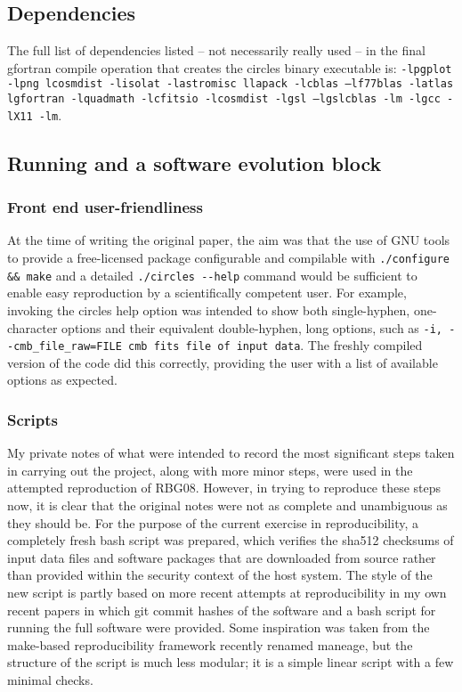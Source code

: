 \subsection{Dependencies}

The full list of dependencies listed -- not necessarily really used -- in
the final {\sc gfortran} compile operation that creates the {\sc circles}
binary executable is:
{\tt \mbox{\tt -lpgplot} -lpng lcosmdist -lisolat -lastromisc llapack -lcblas
--lf77blas -latlas lgfortran -lquadmath -lcfitsio -lcosmdist -lgsl
--lgslcblas -lm -lgcc -lX11 -lm}. \sloppy

\subsection{Running and a software evolution block} \label{s-running}

\subsubsection{Front end user-friendliness}

At the time of writing the original paper, the aim was that the use of GNU
tools to provide a free-licensed package configurable and compilable
with {\tt ./configure \&\& make} and a detailed {\tt ./circles
  -{}-help} command would be sufficient to enable easy reproduction by
a scientifically competent user. For example, invoking the {\sc
  circles} help option was intended to show both single-hyphen, one-character options
and their equivalent double-hyphen, long options, such as
\mbox{{\tt -i,  -{}-cmb\_file\_raw=FILE cmb fits file of input data}}.
The freshly compiled version of the code did this correctly, providing the
user with a list of available options as expected.
\sloppy

\subsubsection{Scripts}

\fussy
My private notes of what were intended to record the most significant steps
taken in carrying out the project, along with more minor steps, were
used in the attempted reproduction of RBG08.  However, in trying to
reproduce these steps now, it is clear that the original notes were
not as complete and unambiguous as they should be.  For the purpose of
the current exercise in reproducibility, a completely fresh {\sc bash}
script was prepared, which verifies the sha512 checksums of input data
files and software packages that are downloaded from source rather
than provided within the security context of the host system. The
style of the new script is partly based on more recent attempts at
reproducibility in my own recent papers in which {\sc git} commit
hashes of the software\supercite{Roukema17silvir} and a {\sc bash}
script for running the full software\supercite{RO19flatness} were
provided. Some inspiration was taken from the {\sc make}-based reproducibility
framework\supercite{Akhlaghi15} recently renamed
{\sc maneage}\supercite{Akhlaghi2020}, but the structure of the
script is much less modular; it is a simple linear script with a
few minimal checks.

